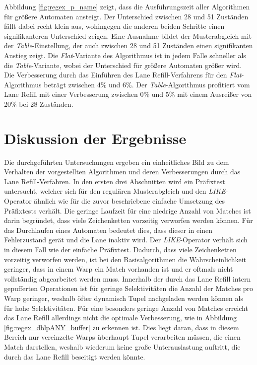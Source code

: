 Abbildung \ref{fig:regex_p_name} zeigt, dass die Ausführungszeit aller Algorithmen für größere Automaten ansteigt.
Der Unterschied zwischen 28 und 51 Zuständen fällt dabei recht klein aus, wohingegen die anderen beiden Schritte einen signifikanteren Unterschied zeigen.
Eine Ausnahme bildet der Musterabgleich mit der \emph{Table}-Einstellung, der auch zwischen 28 und 51 Zuständen einen signifikanten Anstieg zeigt.
Die \emph{Flat}-Variante des Algorithmus ist in jedem Falle schneller als die \emph{Table}-Variante, wobei der Unterschied für größere Automaten größer wird.
Die Verbesserung durch das Einführen des Lane Refill-Verfahrens für den \emph{Flat}-Algorithmus beträgt zwischen 4\% und 6\%.
Der \emph{Table}-Algorithmus profitiert vom Lane Refill mit einer Verbesserung zwischen 0\% und 5\% mit einem Ausreißer von 20\% bei 28 Zuständen.

\section{Diskussion der Ergebnisse}

Die durchgeführten Untersuchungen ergeben ein einheitliches Bild zu dem Verhalten der vorgestellten Algorithmen und deren Verbesserungen durch das Lane Refill-Verfahren.
In den ersten drei Abschnitten wird ein Präfixtest untersucht, welcher sich für den regulären Musterabgleich und den \emph{LIKE}-Operator ähnlich wie für die zuvor beschriebene einfache Umsetzung des Präfixtests verhält.
Die geringe Laufzeit für eine niedrige Anzahl von Matches ist darin begründet, dass viele Zeichenketten vorzeitig verworfen werden können.
Für das Durchlaufen eines Automaten bedeutet dies, dass dieser in einen Fehlerzustand gerät und die Lane inaktiv wird.
Der \emph{LIKE}-Operator verhält sich in diesem Fall wie der einfache Präfixtest.
Dadurch, dass viele Zeichenketten vorzeitig verworfen werden, ist bei den Basisalgorithmen die Wahrscheinlichkeit geringer, dass in einem Warp ein Match vorhanden ist und er oftmals nicht vollständig abgearbeitet werden muss.
Innerhalb der durch das Lane Refill intern gepufferten Operationen ist für geringe Selektivitäten die Anzahl der Matches pro Warp geringer, weshalb öfter dynamisch Tupel nachgeladen werden können als für hohe Selektivitäten.
Für eine besonders geringe Anzahl von Matches erreicht das Lane Refill allerdings nicht die optimale Verbesserung, wie in Abbildung \ref{fig:regex_dblpANY_buffer} zu erkennen ist.
Dies liegt daran, dass in diesem Bereich nur vereinzelte Warps überhaupt Tupel verarbeiten müssen, die einen Match darstellen, weshalb wiederum keine große Unterauslastung auftritt, die durch das Lane Refill beseitigt werden könnte.

